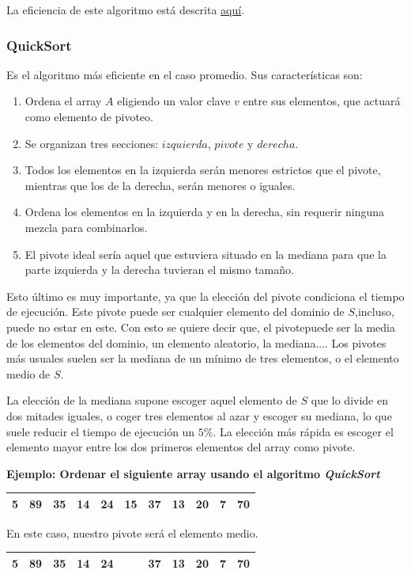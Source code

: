 \documentclass[10pt,a4paper,spanish]{report}
\theoremstyle{definition}
\theoremstyle{remark}
\begin{document}
La eficiencia de este algoritmo está descrita \hyperref[ef_merge]{aquí}.

\subsubsection{\textcolor[rgb]{0.2,0.5,0.5}QuickSort}

Es el algoritmo más eficiente en el caso promedio. Sus características son:
\begin{enumerate}[$\spadesuit$]
    \item Ordena el array $A$ eligiendo un valor clave $v$ entre sus elementos, que actuará como elemento de pivoteo.
    \item Se organizan tres secciones: $izquierda$, $pivote$ y $derecha$.
    \item Todos los elementos en la izquierda serán menores estrictos que el pivote, mientras que los de la derecha, serán menores o iguales.
    \item Ordena los elementos en la izquierda y en la derecha, sin requerir ninguna mezcla para combinarlos.
    \item El pivote ideal sería aquel que estuviera situado en la mediana para que la parte izquierda y la derecha tuvieran el mismo tamaño.
\end{enumerate}

Esto último es muy importante, ya que la elección del pivote condiciona el tiempo de ejecución. Este pivote puede ser cualquier elemento del dominio de $S$,incluso, puede no estar en este. Con esto se quiere decir que, el pivotepuede ser la media de los elementos del dominio, un elemento aleatorio, la mediana.... Los pivotes más usuales suelen ser la mediana de un mínimo de tres elementos, o el elemento medio de $S$.

La elección de la mediana supone escoger aquel elemento de $S$ que lo divide en dos mitades iguales, o coger tres elementos al azar y escoger su mediana, lo que suele reducir el tiempo de ejecución un $5\%$. La elección más rápida es escoger el elemento mayor entre los dos primeros elementos del array como pivote.

\textbf{\textcolor[rgb]{0.2,0.5,0.5}{Ejemplo:} Ordenar el siguiente array usando el algoritmo \textit{\textcolor[rgb]{0.2,0.5,0.5}{QuickSort}}}

\begin{center}
\begin{tabular}{|c|c|c|c|c|c|c|c|c|c|c|}
\hline
5 & 89 & 35 & 14 & 24 & 15 & 37 & 13 & 20 & 7 & 70 \\
\hline  
\end{tabular}
\end{center}
En este caso, nuestro pivote será el elemento medio.
\begin{center}
\begin{tabular}{|c|c|c|c|c|c|c|c|c|c|c|}
\hline
\cellcolor{red}5 & \cellcolor{red}89 & \cellcolor{red}35 &\cellcolor{red} 14 &\cellcolor{red} 24 &\cellcolor{blue} \textcolor{white}{15}&\cellcolor{red} 37 &\cellcolor{red} 13 &\cellcolor{red} 20 &\cellcolor{red} 7 &\cellcolor{red} 70 \\
\hline
\end{tabular}
\end{center}
\end{document}
